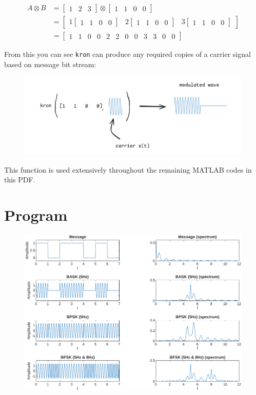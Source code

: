 $$\begin{aligned}
	A \otimes B &= \begin{bmatrix}1 & 2 & 3\end{bmatrix} \otimes \begin{bmatrix}1 & 1 & 0 & 0\end{bmatrix} \\
&= \begin{bmatrix}
1 \begin{bmatrix}1 & 1 & 0 & 0\end{bmatrix} & 
2 \begin{bmatrix}1 & 1 & 0 & 0\end{bmatrix} & 
3 \begin{bmatrix}1 & 1 & 0 & 0\end{bmatrix}
\end{bmatrix} \\
&= \left[\begin{array}{cccccccccccc}
	1 & 1 & 0 & 0 & 2 & 2 & 0 & 0 & 3 & 3 & 0 & 0
\end{array}\right]
\end{aligned}
$$

From this you can see \texttt{kron} can produce any required copies of a carrier signal based on message bit stream:

\begin{figure}[!ht]
	\centering
	\includegraphics[width=\textwidth]{img/kron.pdf}
\end{figure}

This function is used extensively throughout the remaining MATLAB codes in this PDF.

\section*{Program}

\begin{figure}[!ht]
	\centering
	\includegraphics[width=\textwidth]{img/bsk.pdf}
\end{figure}


